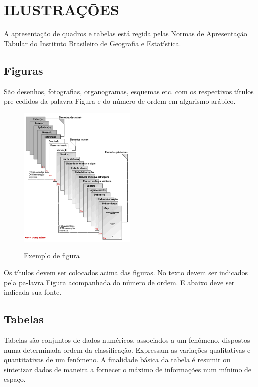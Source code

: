 %
%

\chapter{ILUSTRAÇÕES}

A apresentação de quadros e tabelas está regida pelas Normas de Apresentação Tabular do Instituto Brasileiro de Geografia e Estatística.

\section{Figuras}

São desenhos, fotografias, organogramas, esquemas etc. com os respectivos títulos pre-cedidos da palavra Figura e do número de ordem em algarismo arábico.

\begin{figure}[H]
    \centering
    \caption{Exemplo de figura}
    \includegraphics[width=0.5\textwidth]{figuras/abnt}
    \label{fig:ilustfig}
    {}
\end{figure}

Os títulos devem ser colocados acima das figuras. No texto devem
ser indicados pela pa-lavra Figura acompanhada do número de ordem. E abaixo deve ser indicada sua fonte.

\section{Tabelas}

Tabelas são conjuntos de dados numéricos, associados a um
fenômeno, dispostos numa determinada ordem da classificação. Expressam as variações qualitativas e quantitativas de um fenômeno. A finalidade básica da tabela é resumir ou sintetizar dados de maneira a fornecer o máximo de informações num mínimo de espaço.

